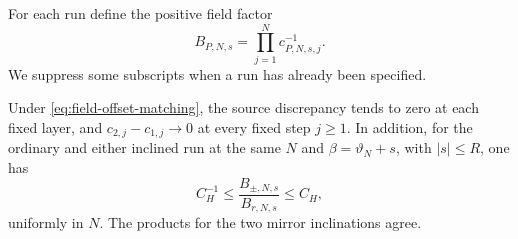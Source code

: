 For each run define the positive field factor
\begin{equation}
 B_{P,N,s}=\prod_{j=1}^N c_{P,N,s,j}^{-1}.
 \label{eq:offset-field-factor}
\end{equation}
We suppress some subscripts when a run has already been specified.

\begin{lemma}
\label{lem:source-comparison}
Under \eqref{eq:field-offset-matching}, the source discrepancy tends to
zero at each fixed layer, and $c_{2,j}-c_{1,j}\to0$ at every fixed step
$j\ge1$.  In addition, for the ordinary and either inclined run at the
same $N$ and $\beta=\vartheta_N+s$, with $|s|\le R$, one has
\begin{equation}
 C_H^{-1}\le \frac{B_{\pm,N,s}}{B_{r,N,s}}\le C_H,
 \label{eq:offset-product-ratio}
\end{equation}
uniformly in $N$.  The products for the two mirror inclinations agree.
\end{lemma}

